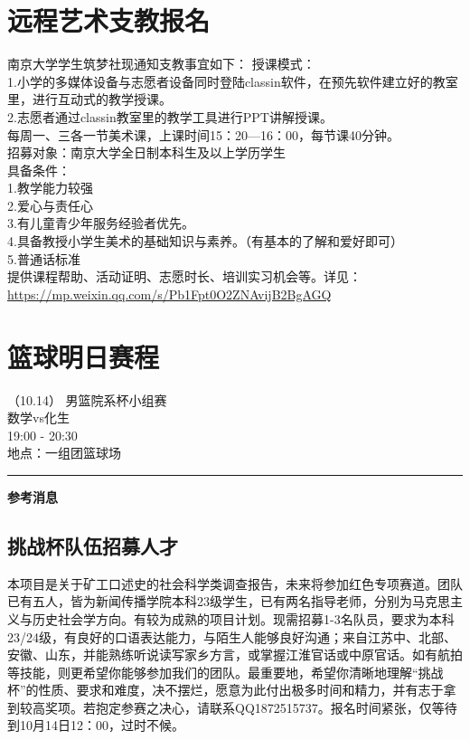 \documentclass[letterpaper, 12pt]{article}
\begin{document}
\begin{multicols}{2}
\section{远程艺术支教报名}
南京大学学生筑梦社现通知支教事宜如下：
授课模式：\\
1.小学的多媒体设备与志愿者设备同时登陆classin软件，在预先软件建立好的教室里，进行互动式的教学授课。\\
2.志愿者通过classin教室里的教学工具进行PPT讲解授课。\\
每周一、三各一节美术课，上课时间15：20—16：00，每节课40分钟。\\
招募对象：南京大学全日制本科生及以上学历学生\\
具备条件：\\
1.教学能力较强\\
2.爱心与责任心\\
3.有儿童青少年服务经验者优先。\\
4.具备教授小学生美术的基础知识与素养。（有基本的了解和爱好即可）\\
5.普通话标准\\
提供课程帮助、活动证明、志愿时长、培训实习机会等。详见：\url{https://mp.weixin.qq.com/s/Pb1Fpt0O2ZNAvijB2BgAGQ}

\section{篮球明日赛程}
（10.14）
男篮院系杯小组赛 \\
数学vs化生 \\
19:00 - 20:30\\
地点：一组团篮球场\\




\end{multicols} 

\hrule
\vspace{4mm}
\centerline{\huge\textbf{参考消息}}
\begin{multicols}{2}
\section{挑战杯队伍招募人才}
本项目是关于矿工口述史的社会科学类调查报告，未来将参加红色专项赛道。团队已有五人，皆为新闻传播学院本科23级学生，已有两名指导老师，分别为马克思主义与历史社会学方向。有较为成熟的项目计划。现需招募1-3名队员，要求为本科23/24级，有良好的口语表达能力，与陌生人能够良好沟通；来自江苏中、北部、安徽、山东，并能熟练听说读写家乡方言，或掌握江淮官话或中原官话。如有航拍等技能，则更希望你能够参加我们的团队。最重要地，希望你清晰地理解“挑战杯”的性质、要求和难度，决不摆烂，愿意为此付出极多时间和精力，并有志于拿到较高奖项。若抱定参赛之决心，请联系QQ1872515737。报名时间紧张，仅等待到10月14日12：00，过时不候。
\end{multicols} 
\end{document}
